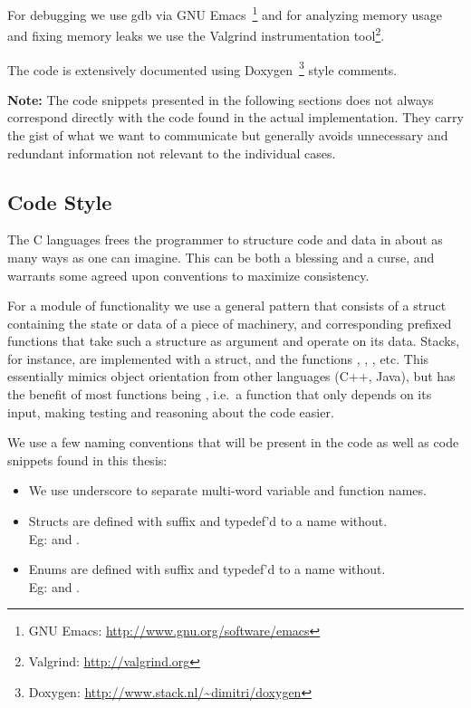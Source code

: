For debugging we use gdb via GNU Emacs~\footnote{GNU Emacs:
  \url{http://www.gnu.org/software/emacs}} and for analyzing memory usage and
fixing memory leaks we use the Valgrind instrumentation tool\footnote{Valgrind:
  \url{http://valgrind.org}}.

The code is extensively documented using Doxygen~\footnote{Doxygen:
  \url{http://www.stack.nl/~dimitri/doxygen}} style comments.

\textbf{Note:} The code snippets presented in the following sections does not
always correspond directly with the code found in the actual
implementation. They carry the gist of what we want to communicate but generally
avoids unnecessary and redundant information not relevant to the individual
cases.

\subsection{Code Style}

The C languages frees the programmer to structure code and data in about as many
ways as one can imagine. This can be both a blessing and a curse, and warrants
some agreed upon conventions to maximize consistency.

For a module of functionality we use a general pattern that consists of a struct
containing the state or data of a piece of machinery, and corresponding prefixed
functions that take such a structure as argument and operate on its
data. Stacks, for instance, are implemented with a  struct, and the
functions , , , etc. This
essentially mimics object orientation from other languages (C++, Java), but has
the benefit of most functions being , i.e.~a function that only
depends on its input, making testing and reasoning about the code easier.

We use a few naming conventions that will be present in the code as well as code
snippets found in this thesis: %

\begin{itemize}
\item We use underscore to separate multi-word variable and function names.
\item Structs are defined with  suffix and typedef'd to a name
  without.\\Eg:  and .
\item Enums are defined with  suffix and typedef'd to a name
  without.\\Eg:  and .
\end{itemize}

